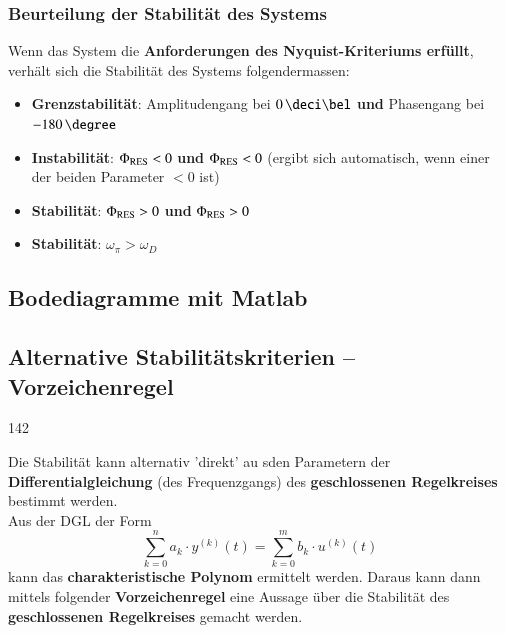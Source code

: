 \subsubsection{Beurteilung der Stabilität des Systems}

Wenn das System die \textbf{Anforderungen des Nyquist-Kriteriums erfüllt}, verhält sich die Stabilität des Systems folgendermassen:

\begin{itemize}
    \item \textbf{Grenzstabilität}: Amplitudengang bei $0 \, \deci \bel$ \textbf{und} Phasengang bei $-180 \, \degree$
    \item \textbf{Instabilität}:  $\Phi_{\rm RES} < 0$ \textbf{und} $\Phi_{\rm RES} < 0$ (ergibt sich automatisch, wenn einer der 
        beiden Parameter $< 0$ ist)
    \item \textbf{Stabilität}: $\Phi_{\rm RES} > 0$ \textbf{und} $\Phi_{\rm RES} > 0$ 
    \item \textbf{Stabilität}: $\omega_{\pi} > \omega_D$  %
\end{itemize}


\subsection{Bodediagramme mit Matlab}




\subsection{Alternative Stabilitätskriterien -- Vorzeichenregel}{142}

Die Stabilität kann alternativ 'direkt' au sden Parametern der \textbf{Differentialgleichung} (des
Frequenzgangs) des \textbf{geschlossenen Regelkreises} bestimmt werden.\\
Aus der DGL der Form
$$ \sum\limits_{k=0}^n a_k \cdot y^{(k)}(t) = \sum\limits_{k=0}^m b_k \cdot u^{(k)}(t) $$
kann das \textbf{charakteristische Polynom} ermittelt werden. Daraus kann dann mittels 
folgender \textbf{Vorzeichenregel} eine Aussage über die Stabilität des \textbf{geschlossenen Regelkreises} 
gemacht werden.



